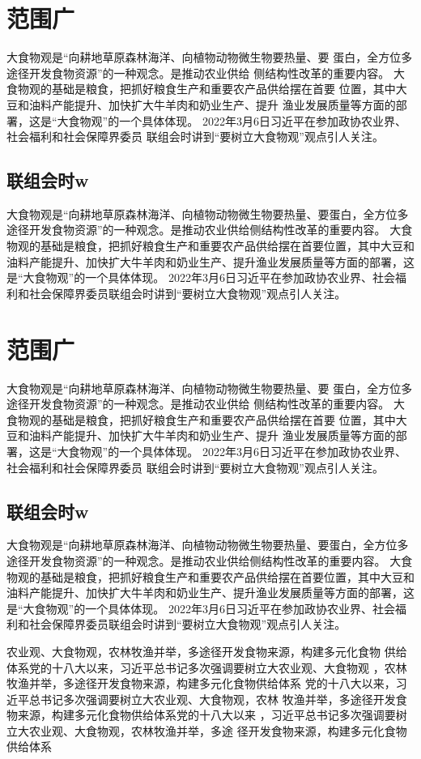 	\section{范围广}
	大食物观是“向耕地草原森林海洋、向植物动物微生物要热量、要
	蛋白，全方位多途径开发食物资源”的一种观念。是推动农业供给
	侧结构性改革的重要内容。
大食物观的基础是粮食，把抓好粮食生产和重要农产品供给摆在首要
位置，其中大豆和油料产能提升、加快扩大牛羊肉和奶业生产、提升
渔业发展质量等方面的部署，这是“大食物观”的一个具体体现。
2022年3月6日习近平在参加政协农业界、社会福利和社会保障界委员
联组会时讲到“要树立大食物观”观点引人关注。
\subsection{联组会时w}
大食物观是“向耕地草原森林海洋、向植物动物微生物要热量、要蛋白，全方位多途径开发食物资源”的一种观念。是推动农业供给侧结构性改革的重要内容。
大食物观的基础是粮食，把抓好粮食生产和重要农产品供给摆在首要位置，其中大豆和油料产能提升、加快扩大牛羊肉和奶业生产、提升渔业发展质量等方面的部署，这是“大食物观”的一个具体体现。
2022年3月6日习近平在参加政协农业界、社会福利和社会保障界委员联组会时讲到“要树立大食物观”观点引人关注。
\section{范围广}
大食物观是“向耕地草原森林海洋、向植物动物微生物要热量、要
蛋白，全方位多途径开发食物资源”的一种观念。是推动农业供给
侧结构性改革的重要内容。
大食物观的基础是粮食，把抓好粮食生产和重要农产品供给摆在首要
位置，其中大豆和油料产能提升、加快扩大牛羊肉和奶业生产、提升
渔业发展质量等方面的部署，这是“大食物观”的一个具体体现。
2022年3月6日习近平在参加政协农业界、社会福利和社会保障界委员
联组会时讲到“要树立大食物观”观点引人关注。
\subsection{联组会时w}
大食物观是“向耕地草原森林海洋、向植物动物微生物要热量、要蛋白，全方位多途径开发食物资源”的一种观念。是推动农业供给侧结构性改革的重要内容。
大食物观的基础是粮食，把抓好粮食生产和重要农产品供给摆在首要位置，其中大豆和油料产能提升、加快扩大牛羊肉和奶业生产、提升渔业发展质量等方面的部署，这是“大食物观”的一个具体体现。
2022年3月6日习近平在参加政协农业界、社会福利和社会保障界委员联组会时讲到“要树立大食物观”观点引人关注。

农业观、大食物观，农林牧渔并举，多途径开发食物来源，构建多元化食物
供给体系党的十八大以来，习近平总书记多次强调要树立大农业观、大食物观
，农林牧渔并举，多途径开发食物来源，构建多元化食物供给体系
党的十八大以来，习近平总书记多次强调要树立大农业观、大食物观，农林
牧渔并举，多途径开发食物来源，构建多元化食物供给体系党的十八大以来
，习近平总书记多次强调要树立大农业观、大食物观，农林牧渔并举，多途
径开发食物来源，构建多元化食物供给体系	

